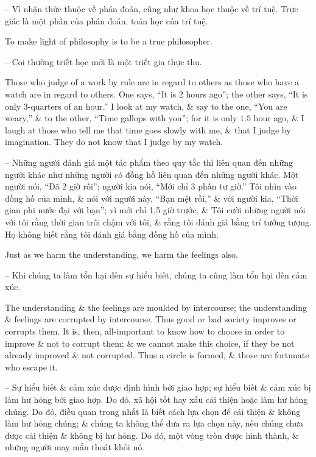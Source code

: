 \documentclass{article}
\begin{document}
\begin{enumerate}
\begin{itemize}
		-- Vì nhận thức thuộc về phán đoán, cũng như khoa học thuộc về trí tuệ. Trực giác là một phần của phán đoán, toán học của trí tuệ.
		
		To make light of philosophy is to be a true philosopher.
		
		-- Coi thường triết học mới là một triết gia thực thụ.
		
		 Those who judge of a work by rule are in regard to others as those who have a watch are in regard to others. One says, ``It is 2 hours ago''; the other says, ``It is only 3-quarters of an hour.'' I look at my watch, \& say to the one, ``You are weary,'' \& to the other, ``Time gallops with you''; for it is only $1.5$ hour ago, \& I laugh at those who tell me that time goes slowly with me, \& that I judge by imagination. They do not know that I judge by my watch.
		
		-- Những người đánh giá một tác phẩm theo quy tắc thì liên quan đến những người khác như những người có đồng hồ liên quan đến những người khác. Một người nói, ``Đã 2 giờ rồi''; người kia nói, ``Mới chỉ 3 phần tư giờ.'' Tôi nhìn vào đồng hồ của mình, \& nói với người này, ``Bạn mệt rồi,'' \& với người kia, ``Thời gian phi nước đại với bạn''; vì mới chỉ 1,5 giờ trước, \& Tôi cười những người nói với tôi rằng thời gian trôi chậm với tôi, \& rằng tôi đánh giá bằng trí tưởng tượng. Họ không biết rằng tôi đánh giá bằng đồng hồ của mình.
		
		 Just as we harm the understanding, we harm the feelings also.
		
		-- Khi chúng ta làm tổn hại đến sự hiểu biết, chúng ta cũng làm tổn hại đến cảm xúc.
		
		The understanding \& the feelings are moulded by intercourse; the understanding \& feelings are corrupted by intercourse. Thus good or bad society improves or corrupts them. It is, then, all-important to know how to choose in order to improve \& not to corrupt them; \& we cannot make this choice, if they be not already improved \& not corrupted. Thus a circle is formed, \& those are fortunate who escape it.
		
		-- Sự hiểu biết \& cảm xúc được định hình bởi giao hợp; sự hiểu biết \& cảm xúc bị làm hư hỏng bởi giao hợp. Do đó, xã hội tốt hay xấu cải thiện hoặc làm hư hỏng chúng. Do đó, điều quan trọng nhất là biết cách lựa chọn để cải thiện \& không làm hư hỏng chúng; \& chúng ta không thể đưa ra lựa chọn này, nếu chúng chưa được cải thiện \& không bị hư hỏng. Do đó, một vòng tròn được hình thành, \& những người may mắn thoát khỏi nó.
		

\end{itemize}
\end{enumerate}
\end{document}
